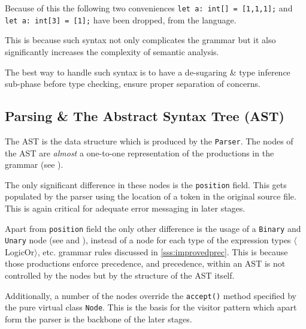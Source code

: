 Because of this the following two conveniences \texttt{let a:
int[] = [1,1,1];} and \texttt{let a: int[3] = [1];} have been
dropped, from the language.

This is because such syntax not only complicates the grammar but
it also significantly increases the complexity of semantic
analysis.

The best way to handle such syntax is to have a de-sugaring \&
type inference sub-phase before type checking, ensure proper
separation of concerns.

\subsection{Parsing \& The Abstract Syntax Tree (AST)}

The AST is the data structure which is produced by the
\texttt{Parser}. The nodes of the AST are \emph{almost} a
one-to-one representation of the productions in the grammar (see
).



The only significant difference in these nodes is the
\texttt{position} field. This gets populated by the parser using
the location of a token in the original source file. This is
again critical for adequate error messaging in later stages.

\pagebreak





Apart from \texttt{position} field the only other difference is
the usage of a \texttt{Binary} and \texttt{Unary} node (see
 and ), instead of a node
for each type of the expression types $\langle$LogicOr$\rangle$,
etc. grammar rules discussed in \ref{sss:improvedprec}. This is
because those productions enforce precedence, and precedence,
within an AST is not controlled by the nodes but by the
structure of the AST itself.

Additionally, a number of the nodes override the
\texttt{accept()} method specified by the pure virtual class
\texttt{Node}. This is the basis for the visitor pattern which
apart form the parser is the backbone of the later stages.

